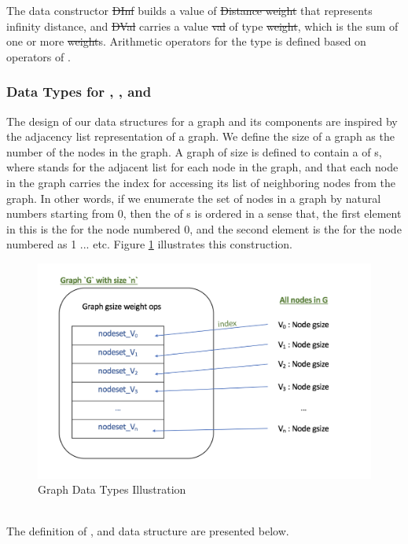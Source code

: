 The data constructor \st{DInf} builds a value of \st{Distance weight} that represents infinity distance, and \st{DVal} carries a value \st{val} of type \st{weight}, which is the sum of one or more \st{weight}s. Arithmetic operators for the  type is defined based on operators of .
\\

\subsubsection{Data Types for , , and } \label{graph}
The design of our data structures for a graph and its components are inspired by the adjacency list representation of a graph. We define the size of a graph as the number of the nodes in the graph. A graph of size  is defined to contain a  of  s, where  stands for the adjacent list for each node in the graph, and that each node in the graph carries the index for accessing its list of neighboring nodes from the graph. In other words, if we enumerate the set of nodes in a graph by natural numbers starting from 0, then the  of s is ordered in a sense that, the first element in this  is the  for the node numbered 0, and the second element is the  for the node numbered as 1 ... etc. Figure \ref{figure2} illustrates this construction. 

\begin{figure}[H]
  \centering
  \includegraphics[scale = 0.6]{./figure/graphType.png}
  \caption{Graph Data Types Illustration}
  \label{figure2}
\end{figure}
\tab\\
The definition of ,  and  data structure are presented below.

